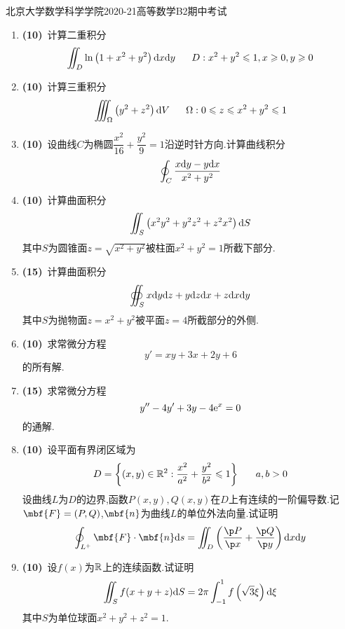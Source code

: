 \documentclass{ctexart}
\begin{document}
\pagestyle{empty}
\begin{center}\Large
    北京大学数学科学学院2020-21高等数学B2期中考试
\end{center}
\begin{enumerate}[leftmargin=*,label=\textbf{\arabic*.}]
    \item \textbf{(10)}\ 计算二重积分
        \[\iint_{D}\ln\left(1+x^2+y^2\right)\dx\di y\ \ \ \ \ D:x^2+y^2\leqslant1,x\geqslant0,y\geqslant0\]
    \item \textbf{(10)}\ 计算三重积分
        \[\iiint_{\Omega}\left(y^2+z^2\right)\di V\ \ \ \ \ \Omega:0\leqslant z\leqslant x^2+y^2\leqslant1\]
    \item \textbf{(10)}\ 设曲线$C$为椭圆$\dfrac{x^2}{16}+\dfrac{y^2}{9}=1$沿逆时针方向.计算曲线积分
        \[\oint_{C}\dfrac{x\mathrm{d} y-y\mathrm{d} x}{x^2+y^2}\]
    \item \textbf{(10)}\ 计算曲面积分
        \[\iint_{S}\left(x^2y^2+y^2z^2+z^2x^2\right)\mathrm{d} S\]
        其中$S$为圆锥面$z=\sqrt{x^2+y^2}$被柱面$x^2+y^2=1$所截下部分.
    \item \textbf{(15)}\ 计算曲面积分
        \[\oiint_Sx\mathrm{d} y\mathrm{d} z+y\mathrm{d} z\mathrm{d} x+z\mathrm{d} x\mathrm{d} y\]
        其中$S$为抛物面$z=x^2+y^2$被平面$z=4$所截部分的外侧.
    \item \textbf{(10)}\ 求常微分方程
        \[y'=xy+3x+2y+6\]
        的所有解.
    \item \textbf{(15)}\ 求常微分方程
        \[y''-4y'+3y-4\mathrm{e}^x=0\]
        的通解.
    \item \textbf{(10)}\ 设平面有界闭区域为
        \[D=\left\{(x,y)\in\R^2:\dfrac{x^2}{a^2}+\dfrac{y^2}{b^2}\leqslant1\right\}\ \ \ \ \ a,b>0\]
        设曲线$L$为$D$的边界,函数$P(x,y),Q(x,y)$在$D$上有连续的一阶偏导数.记$\mbf{F}=(P,Q)$,$\mbf{n}$为曲线$L$的单位外法向量.试证明
        \[\oint_{L^+}\mbf{F}\cdot\mbf{n}\di s=\iint_{D}\left(\dfrac{\p P}{\p x}+\dfrac{\p Q}{\p y}\right)\di x\di y\]
    \item \textbf{(10)}\ 设$f(x)$为$\mathbb{R}$上的连续函数.试证明
        \[\iint_{S}f(x+y+z)\mathrm{d} S=2\pi\int_{-1}^{1}f\left(\sqrt{3}\xi\right)\mathrm{d}\xi\]
        其中$S$为单位球面$x^2+y^2+z^2=1$.
\end{enumerate}
\end{document}
